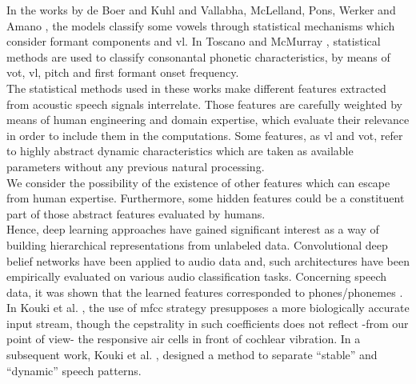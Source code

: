\documentclass[11pt,a4paper]{article}
\begin{document}
In the works by de Boer and Kuhl \cite{boer_2003} and Vallabha, McLelland, Pons,
Werker and Amano \cite{vallabha_2007}, the models classify some vowels
through statistical mechanisms which consider formant components
and \gls{vl}.
In Toscano and McMurray \cite{toscano_2010},
statistical methods are used to classify consonantal phonetic
characteristics, by means of \gls{vot},
\gls{vl}, pitch and first formant onset frequency. \\

The statistical methods used in these works make
different features extracted from acoustic speech signals
interrelate.
Those features are carefully weighted
by means of human engineering and domain expertise,
which evaluate their relevance in order to include them
in the computations.
Some features, as \gls{vl} and \gls{vot},
refer to highly abstract dynamic characteristics
which are taken
as available parameters without any previous natural
processing.\\

We consider the possibility of the existence of other
features which can escape from human expertise.
Furthermore, some hidden features could be a constituent
part of those abstract features evaluated by humans. \\

Hence, deep learning approaches have gained significant interest as a
way of building hierarchical representations from unlabeled data.
Convolutional deep belief networks have been applied to audio data and,
such architectures have been empirically evaluated on various audio classification
tasks. Concerning speech data, it was shown that the learned features corresponded
to phones/phonemes \cite{Lee:2009:UFL:2984093.2984217}. \\

In Kouki et al. \cite{kouki_2010},
the use of \gls{mfcc}
strategy presupposes a more biologically accurate input stream,
though the cepstrality in such coefficients does not reflect
-from our point of view-
the responsive air cells in front of cochlear vibration.
In a subsequent work, Kouki et al. \cite{kouki_2011},
designed a method to separate “stable” and “dynamic” speech
patterns. \\
\end{document}
